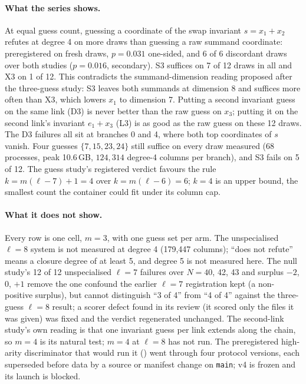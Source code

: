 \paragraph{What the series shows.} At equal guess count, guessing a
coordinate of the swap invariant $s=x_1+x_2$ refutes at degree 4 on more
draws than guessing a raw summand coordinate: preregistered on fresh draws,
$p=0.031$ one-sided, and 6 of 6 discordant draws over both studies
($p=0.016$, secondary). S3 suffices on 7 of 12 draws in all and X3 on 1 of
12. This contradicts the summand-dimension reading proposed after the
three-guess study: S3 leaves both summands at dimension 8 and suffices more
often than X3, which lowers $x_1$ to dimension 7. Putting a second
invariant guess on the same link (D3) is never better than the raw guess on
$x_3$; putting it on the second link's invariant $e_1+x_3$ (L3) is as good
as the raw guess on these 12 draws. The D3 failures all sit at branches 0
and 4, where both top coordinates of $s$ vanish. Four guesses
$\{7,15,23,24\}$ still suffice on every draw measured (68 processes, peak
10.6\,GB, $124{,}314$ degree-4 columns per branch), and S3 fails on 5 of
12. The guess study's registered verdict favours the rule $k=m(\ell-7)+1=4$
over $k=m(\ell-6)=6$; $k=4$ is an upper bound, the smallest count the
container could fit under its column cap.

\paragraph{What it does not show.} Every row is one cell, $m=3$, with one
guess set per arm. The unspecialised $\ell=8$ system is not measured at
degree 4 (179{,}447 columns); ``does not refute'' means a closure degree of at
least 5, and degree 5 is not measured here. The null study's 12 of 12
unspecialised $\ell=7$ failures over $N=40$, 42, 43 and surplus $-2$, 0,
$+1$ remove the one confound the earlier $\ell=7$ registration kept (a
non-positive surplus), but cannot distinguish ``3 of 4'' from ``4 of 4''
against the three-guess $\ell=8$ result; a scorer defect found in its review
(it scored only the files it was given) was fixed and the verdict
regenerated unchanged. The second-link study's own reading
is that one invariant guess per link extends along the chain, so $m=4$ is
its natural test; $m=4$ at $\ell=8$ has not run. The preregistered
high-arity discriminator that would run it
() went through four
protocol versions, each superseded before data by a source or manifest
change on \texttt{main}; v4 is frozen and its launch is blocked.

